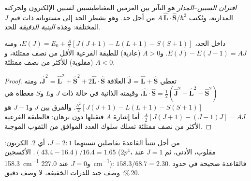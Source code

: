 \begin{definition}\label{def:b3:many-electron-atoms:spin-orbit}
\emph{اقتران السبين--المدار} هو التآثر
بين العزمين المغناطيسيين لسبين الإلكترون ولحركته
المدارية، ويُكتب $A\,\hat{\mathbf L}\cdot\hat{\mathbf S}/\hbar^2$ من أجل حد. وهو
يشطر الحد إلى مستوياته ذات قيم $J$ المختلفة: وهذه \emph{البنية
الدقيقة} للحد.
\end{definition}

\begin{proposition}\label{prop:b3:many-electron-atoms:lande}
داخل الحد، $E(J) = E_0 + \frac{A}{2}[J(J+1) - L(L+1) - S(S+1)]$، ومنه
$E(J) - E(J - 1) = AJ$. و$A > 0$ (عادية) للطبقة الفرعية الأقل من نصف ممتلئة،
و$A < 0$ (مقلوبة) للأكثر من نصف ممتلئة.
\end{proposition}

\begin{proof}
تعطي $\hat{\mathbf J} = \hat{\mathbf L} + \hat{\mathbf S}$ العلاقة $\hat{\mathbf J}^2 =
\hat{\mathbf L}^2 + \hat{\mathbf S}^2 + 2\hat{\mathbf L}\cdot\hat{\mathbf S}$، ومنه
$\hat{\mathbf L}\cdot\hat{\mathbf S} = \frac12(\hat{\mathbf J}^2 - \hat{\mathbf L}^2 -
\hat{\mathbf S}^2)$، وقيمته الذاتية في حالة ذات $J$ و$L$ و$S$ معطاة هي
$\frac{\hbar^2}{2}[J(J+1) - L(L+1) - S(S+1)]$. والفرق بين $J$ 
و$J - 1$ هو $\frac A2[J(J+1) - (J-1)J] = AJ$. أما إشارة $A$ فنقبلها دون برهان: فالطبقة
الفرعية الأكثر من نصف ممتلئة تسلك سلوك العدد الموافق من الثقوب
الموجبة.
\end{proof}

\begin{example}\label{ex:b3:many-electron-atoms:lande-test}
من أجل  تتنبأ القاعدة بفاصلين نسبتهما $J = 2 : 1$، أي 2.
الكربون: $(43.4 - 16.4)/16.4 = 1.65$. الأكسجين ($2p^4$، مقلوب، 
الأدنى، ثم $J = 1$ عند \qty{158.3}{cm^{-1}} و$J = 0$ عند \qty{227.0}{cm^{-1}}):
$158.3/68.7 = 2.30$. فالقاعدة صحيحة في حدود 20\,\%: 
وصف جيد للذرات الخفيفة، لا وصف دقيق.
\end{example}

